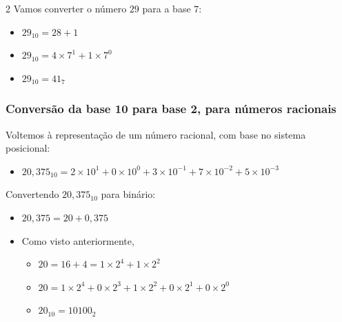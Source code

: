 \documentclass[12pt]{article}
\begin{document}
\begin{multicols}{2}
\raggedcolumns
Vamos converter o número $29$ para a base $7$:
\begin{itemize}
    \item [""] $29_{10} = 28 + 1$
    \item [""] $29_{10} = 4 \times 7^{1} + 1 \times 7^{0}$
    \item [""] $29_{10} = 41_{7}$
\end{itemize}
\columnbreak
\vspace*{0.03cm}
\begin{center}
\end{center}
\end{multicols}
\subsubsection{Conversão da base 10 para base 2, para números racionais}
Voltemos à representação de um número racional, com base no sistema posicional:
\begin{itemize}
    \item [""] $20{,}375_{10} = 2 \times 10^{1} + 0 \times 10^{0} + 3 \times 10^{-1} + 7 \times 10^{-2} + 5 \times 10^{-3}$
\end{itemize}
Convertendo $20,375_{10}$ para binário:
\begin{itemize}
    \item [""] $20,375 = 20 + 0,375$
    \item [""] Como visto anteriormente,
    \begin{itemize}
        \item [""] $20 = 16 + 4 = 1 \times 2^{4} + 1 \times 2^{2}$
        \item [""] $20 = 1 \times 2^{4} + 0 \times 2^{3} + 1 \times 2^{2} + 0 \times 2^{1} + 0 \times 2^{0}$
        \item [""] $20_{10} = 10100_{2}$
    \end{itemize}
\end{itemize}
\end{document}
